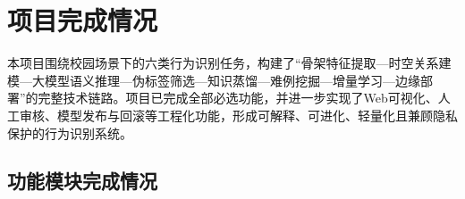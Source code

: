 \chapter{项目完成情况}

本项目围绕校园场景下的六类行为识别任务，构建了“骨架特征提取—时空关系建模—大模型语义推理—伪标签筛选—知识蒸馏—难例挖掘—增量学习—边缘部署”的完整技术链路。项目已完成全部必选功能，并进一步实现了Web可视化、人工审核、模型发布与回滚等工程化功能，形成可解释、可进化、轻量化且兼顾隐私保护的行为识别系统。

\section{功能模块完成情况}


